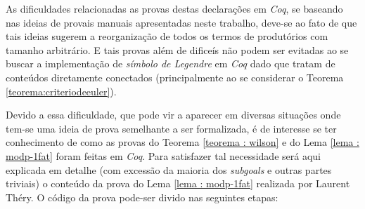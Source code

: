 As dificuldades relacionadas as provas destas declarações em \textit{Coq}, se baseando nas ideias de provais manuais apresentadas neste trabalho, deve-se ao fato de que tais ideias sugerem a reorganização de todos os termos de produtórios com tamanho arbitrário. E tais provas além de dificeís não podem ser evitadas ao se buscar a implementação de \textit{símbolo de Legendre} em \textit{Coq} dado que tratam de conteúdos diretamente conectados (principalmente ao se considerar o Teorema \ref{teorema:criteriodeeuler}).

Devido a essa dificuldade, que pode vir a aparecer em diversas situações onde tem-se uma ideia de prova semelhante a ser formalizada, é de interesse se ter conhecimento de como as provas do Teorema \ref{teorema : wilson} e do Lema \ref{lema : modp-1fat} foram feitas em \textit{Coq}. Para satisfazer tal necessidade será aqui explicada em detalhe (com excessão da maioria dos \textit{subgoals} e outras partes triviais) o conteúdo da prova do Lema \ref{lema : modp-1fat} realizada por Laurent Théry. O código da prova pode-ser divido nas seguintes etapas:

